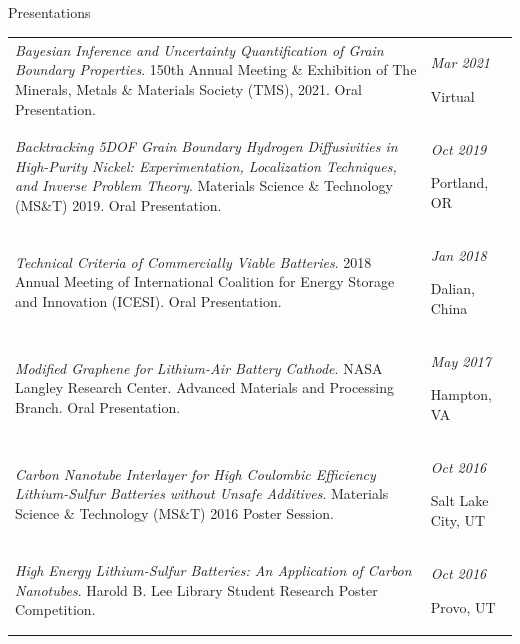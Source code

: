 \documentclass{resume} %
\begin{document}
\begin{rSection}{Presentations}
\begin{longtable}{m{13cm} m{3.5cm}}
{\textit{Bayesian Inference and Uncertainty Quantification of Grain Boundary Properties}. 150th Annual Meeting \& Exhibition of The Minerals, Metals \& Materials Society (TMS), 2021. Oral Presentation.} & {\em \hfill Mar 2021 \par \hfill Virtual} \\
{\textit{Backtracking 5DOF Grain Boundary Hydrogen Diffusivities in High-Purity Nickel: Experimentation, Localization Techniques,
and Inverse Problem Theory}. Materials Science \& Technology (MS\&T) 2019. Oral Presentation.} & {\em \hfill Oct 2019 \par \hfill Portland, OR} \\
{\textit{Technical Criteria of Commercially Viable Batteries}. 2018 Annual Meeting of International Coalition for Energy Storage and Innovation (ICESI). Oral Presentation.} & {\em \hfill Jan 2018 \par \hfill Dalian, China} \\
{\textit{Modified Graphene for Lithium-Air Battery Cathode}. NASA Langley Research Center. Advanced Materials and Processing Branch. Oral Presentation.} & {\em \hfill May 2017 \par \hfill Hampton, VA} \\
{\textit{Carbon Nanotube Interlayer for High Coulombic Efficiency Lithium-Sulfur Batteries without Unsafe Additives}. Materials Science \& Technology (MS\&T) 2016 Poster Session.} & {\em \hfill Oct 2016 \par \hfill Salt Lake City, UT} \\
{\textit{High Energy Lithium-Sulfur Batteries: An Application of Carbon Nanotubes}. Harold B. Lee Library Student Research Poster Competition.} & {\em \hfill Oct 2016 \par \hfill Provo, UT} \\
\end{longtable}
\end{rSection}
\end{document}
